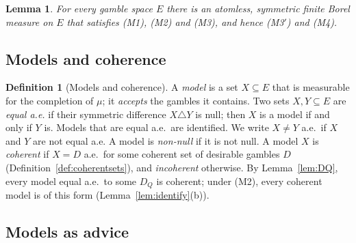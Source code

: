 \documentclass[11pt]{article}
\theoremstyle{plain}
\newtheorem{lemma}[theorem]{Lemma}
\theoremstyle{definition}
\newtheorem{definition}[theorem]{Definition}
\begin{document}
\begin{lemma}\label{lem:measure}
For every gamble space $E$ there is an atomless, symmetric finite Borel measure on $E$ that
satisfies (M1), (M2) and (M3), and hence (M3$'$) and (M4).
\end{lemma}

\subsection{Models and coherence}

\begin{definition}[Models and coherence]\label{def:models}
A \emph{model} is a set $X\subseteq E$ that is measurable for the completion of $\mu$; it
\emph{accepts} the gambles it contains. Two sets $X,Y\subseteq E$ are \emph{equal a.e.} if their
symmetric difference $X\triangle Y$ is null; then $X$ is a model if and only if $Y$ is. Models
that are equal a.e.\ are identified. We write
$X\ne Y$ a.e.\ if $X$ and $Y$ are not equal a.e. A model is \emph{non-null} if it is not null. A model $X$ is
\emph{coherent} if $X=D$ a.e.\ for some coherent set of desirable gambles $D$
(Definition~\ref{def:coherentsets}), and \emph{incoherent} otherwise. By Lemma~\ref{lem:DQ},
every model equal a.e.\ to some $D_Q$ is coherent; under (M2), every coherent model is of this
form (Lemma~\ref{lem:identify}(b)).
\end{definition}

\subsection{Models as advice}
\end{document}
